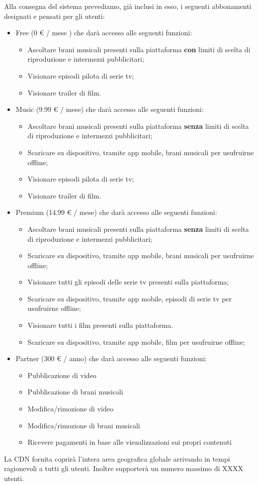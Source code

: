 Alla consegna del sistema prevediamo, già inclusi in esso, i seguenti abbonamenti designati e pensati per gli utenti:
\begin{itemize}
    \item Free (0 € / mese ) che darà accesso alle seguenti funzioni: 
	\begin{itemize}
   		\item Ascoltare brani musicali presenti sulla piattaforma \textbf{con} limiti di scelta di riproduzione e intermezzi pubblicitari;
		\item Visionare episodi pilota di serie tv;
		\item Visionare trailer di film.
	\end{itemize}
    \item Music (9.99 € / mese) che darà accesso alle seguenti funzioni:
	\begin{itemize}
   		\item Ascoltare brani musicali presenti sulla piattaforma \textbf{senza} limiti di scelta di riproduzione e intermezzi pubblicitari;
		\item Scaricare su dispositivo, tramite app mobile, brani musicali per usufruirne offline;
		\item Visionare episodi pilota di serie tv;
		\item Visionare trailer di film.
	\end{itemize}
    \item Premium (14.99 € / mese) che darà accesso alle seguenti funzioni:
	\begin{itemize}
   		\item Ascoltare brani musicali presenti sulla piattaforma \textbf{senza} limiti di scelta di riproduzione e intermezzi pubblicitari;
		\item Scaricare su dispositivo, tramite app mobile, brani musicali per usufruirne offline;
		\item Visionare tutti gli episodi delle serie tv presenti sulla piattaforma;
		\item Scaricare su dispositivo, tramite app mobile, episodi di serie tv per usufruirne offline;
		\item Visionare tutti i film presenti sulla piattaforma.
		\item Scaricare su dispositivo, tramite app mobile, film per usufruirne offline;
	\end{itemize}
	
	\item Partner (300 € / anno) che darà accesso alle seguenti funzioni:
	\begin{itemize}
   		\item Pubblicazione di video
		\item Pubblicazione di brani musicali
		\item Modifica/rimozione di video
		\item Modifica/rimozione di brani musicali
		\item Ricevere pagamenti in base alle visualizzazioni sui propri contenuti
	\end{itemize}
\end{itemize}


La CDN fornita coprirà l’intera area geografica globale arrivando in tempi ragionevoli a tutti gli utenti. Inoltre supporterà un numero massimo di XXXX utenti.

